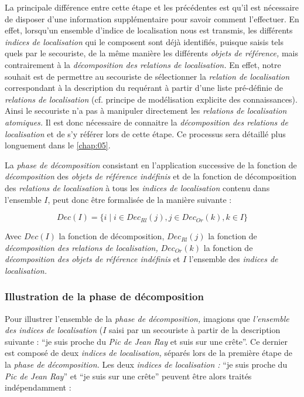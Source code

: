 La principale différence entre cette étape et les
précédentes est qu'il est nécessaire de disposer d'une information
supplémentaire pour savoir comment l'effectuer. En effet, lorsqu'un
ensemble d'indice de localisation nous est transmis, les différents
\emph{indices de localisation} qui le composent sont déjà identifiés,
puisque saisis tels quels par le secouriste, de la même manière les
différents \emph{objets de référence,} mais contrairement à la
\emph{décomposition des relations de localisation.} En effet, notre
souhait est de permettre au secouriste de sélectionner la
\emph{relation de localisation} correspondant à la description du
requérant à partir d'une liste pré-définie de \emph{relations de
  localisation} (cf. principe de modélisation explicite des
connaissances). Ainsi le secouriste n'a pas à manipuler directement
les \emph{relations de localisation atomiques.} Il est donc nécessaire
de connaitre la \emph{décomposition des relations de localisation} et
de s'y référer lors de cette étape. Ce processus sera détaillé plus
longuement dans le \autoref{chap:05}.

La \emph{phase de décomposition} consistant en l’application
successive de la fonction de \emph{décomposition} des \emph{objets de
  référence indéfinis} et de la fonction de décomposition des
\emph{relations de localisation} à tous les \emph{indices de
  localisation} contenu dans l'ensemble \(I\), peut donc être
formalisée de la manière suivante :

\begin{equation}
  Dec(I) = \{ i \mid i \in Dec_{Rl}(j), j \in  Dec_{Or}(k), k \in I\} 
\end{equation}

Avec \(Dec(I)\) la fonction de décomposition, \(Dec_{Rl}(j)\) la
fonction de \emph{décomposition des relations de localisation,}
\(Dec_{Or}(k)\) la fonction de \emph{décomposition des objets de
  référence indéfinis }et \(I\) l'ensemble des \emph{indices de
  localisation.}

\subsubsection{Illustration de la phase de décomposition}
\label{subsec:4-3-3-4}

Pour illustrer l'ensemble de la \emph{phase de décomposition,}
imagions que \emph{l'ensemble des indices de localisation} (\(I\)
saisi par un secouriste à partir de la description suivante :
\enquote{je suis proche du \emph{Pic de Jean Ray} et suis sur une
  crête}. Ce dernier est composé de deux \emph{indices de
  localisation,} séparés lors de la première étape de la \emph{phase
  de décomposition.} Les deux \emph{indices de localisation :}
\enquote{je suis proche du \emph{Pic de Jean Ray}} et \enquote{je suis
  sur une crête} peuvent être alors traités indépendamment :

